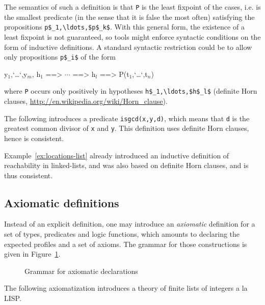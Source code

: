 The semantics of such a definition is that \lstinline|P| is the least fixpoint
of the cases, i.e. is the smallest predicate (in the sense that it is
false the most often) satisfying the propositions \lstinline|p$_1,\ldots,$p$_k$|.
With this general form, the existence of a least fixpoint is not
guaranteed, so tools might enforce syntactic conditions on the form of
inductive definitions. A standard syntactic restriction could be to
allow only propositions \lstinline|p$_i$| of the form
\begin{listing-nonumber}
\forall y$_1$,`\dots`,y$_m$, h$_1$ ==> $\cdots$ ==> h$_l$ ==> P(t$_1$,`\dots`,t$_n$)
\end{listing-nonumber}
where \lstinline|P| occurs only positively in hypotheses \lstinline|h$_1,\ldots,$h$_l$|
(definite Horn clauses,
\url{http://en.wikipedia.org/wiki/Horn_clause}).

\begin{example}
  The following introduces a predicate \lstinline|isgcd(x,y,d)|, which means
  that \lstinline|d| is the greatest common divisor of \lstinline|x|
  and \lstinline|y|.
  This definition uses definite Horn clauses, hence is consistent.
\end{example}

Example~\ref{ex:locations-list} already introduced an inductive definition of
reachability in linked-lists, and was also based on definite Horn
clauses, and is thus consistent.

\subsection{Axiomatic definitions}

Instead of an explicit definition, one may introduce an
\emph{axiomatic} definition for a set of types, predicates and logic
functions, which amounts to declaring the expected profiles and a set of
axioms. The grammar for those constructions is given in
Figure~\ref{fig:gram:logicdecl}.

\begin{figure}[t]
  \begin{cadre} 
    \end{cadre}
  \caption{Grammar for axiomatic declarations}
\label{fig:gram:logicdecl}
\end{figure}

\begin{example}
  The following axiomatization introduces a theory of finite lists of
  integers a la LISP.
\end{example}

